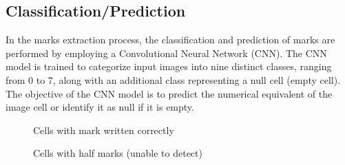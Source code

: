  \subsection{Classification/Prediction}

 In the marks extraction process, the classification and prediction of marks are performed by employing a Convolutional Neural Network (CNN). The CNN model is trained to categorize input images into nine distinct classes, ranging from 0 to 7, along with an additional class representing a null cell (empty cell). The objective of the CNN model is to predict the numerical equivalent of the image cell or identify it as null if it is empty.

\begin{figure}[htbp]
    \centering
    \hfill
    \caption{Cells with mark written correctly}
    
    \vspace{\floatsep}
    
    \hfill
    \caption{Cells with half marks (unable to detect)}
    

\end{figure}
